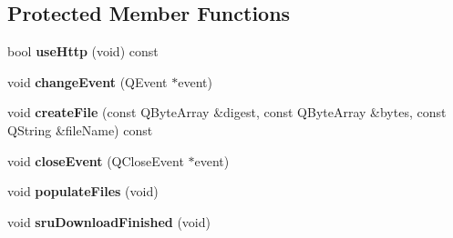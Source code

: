 \subsection*{Protected Member Functions}
\begin{DoxyCompactItemize}
\item 
bool {\bfseries use\+Http} (void) const \hypertarget{classbiblioteq__magazine_a4417201ab4c6d0718580d3d48e6f2406}{}\label{classbiblioteq__magazine_a4417201ab4c6d0718580d3d48e6f2406}

\item 
void {\bfseries change\+Event} (Q\+Event $\ast$event)\hypertarget{classbiblioteq__magazine_a724764880bf4aed8878a6a43681faf3f}{}\label{classbiblioteq__magazine_a724764880bf4aed8878a6a43681faf3f}

\item 
void {\bfseries create\+File} (const Q\+Byte\+Array \&digest, const Q\+Byte\+Array \&bytes, const Q\+String \&file\+Name) const \hypertarget{classbiblioteq__magazine_ae1863bcd350f14146b7a6589157b2608}{}\label{classbiblioteq__magazine_ae1863bcd350f14146b7a6589157b2608}

\item 
void {\bfseries close\+Event} (Q\+Close\+Event $\ast$event)\hypertarget{classbiblioteq__magazine_a87f20b7fc43d1ea4fe1793112604f34a}{}\label{classbiblioteq__magazine_a87f20b7fc43d1ea4fe1793112604f34a}

\item 
void {\bfseries populate\+Files} (void)\hypertarget{classbiblioteq__magazine_aa314072fc48397808a82bbe49d378a56}{}\label{classbiblioteq__magazine_aa314072fc48397808a82bbe49d378a56}

\item 
void {\bfseries sru\+Download\+Finished} (void)\hypertarget{classbiblioteq__magazine_a0d651d79caeed52b2d2022e854adf027}{}\label{classbiblioteq__magazine_a0d651d79caeed52b2d2022e854adf027}

\end{DoxyCompactItemize}
